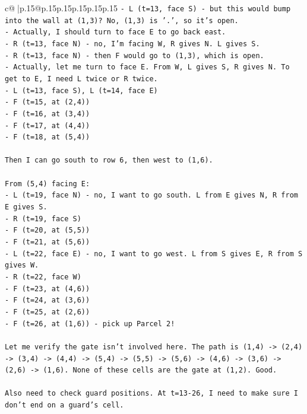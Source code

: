 \documentclass{article}
\begin{document}
{\begin{supertabular}{c@{$\;$}|p{.15\linewidth}@{}p{.15\linewidth}p{.15\linewidth}p{.15\linewidth}p{.15\linewidth}p{.15\linewidth}}
{{{\texttt{{-} L (t=13, face S) {-} but this would bump into the wall at (1,3)? No, (1,3) is '.', so it's open.} \\
\texttt{{-} Actually, I should turn to face E to go back east.} \\
\texttt{{-} R (t=13, face N) {-} no, I'm facing W, R gives N. L gives S.} \\
\texttt{{-} R (t=13, face N) {-} then F would go to (1,3), which is open.} \\
\texttt{{-} Actually, let me turn to face E. From W, L gives S, R gives N. To get to E, I need L twice or R twice.} \\
\texttt{{-} L (t=13, face S), L (t=14, face E)} \\
\texttt{{-} F (t=15, at (2,4))} \\
\texttt{{-} F (t=16, at (3,4))} \\
\texttt{{-} F (t=17, at (4,4))} \\
\texttt{{-} F (t=18, at (5,4))} \\
\\ 
\texttt{Then I can go south to row 6, then west to (1,6).} \\
\\ 
\texttt{From (5,4) facing E:} \\
\texttt{{-} L (t=19, face N) {-} no, I want to go south. L from E gives N, R from E gives S.} \\
\texttt{{-} R (t=19, face S)} \\
\texttt{{-} F (t=20, at (5,5))} \\
\texttt{{-} F (t=21, at (5,6))} \\
\texttt{{-} L (t=22, face E) {-} no, I want to go west. L from S gives E, R from S gives W.} \\
\texttt{{-} R (t=22, face W)} \\
\texttt{{-} F (t=23, at (4,6))} \\
\texttt{{-} F (t=24, at (3,6))} \\
\texttt{{-} F (t=25, at (2,6))} \\
\texttt{{-} F (t=26, at (1,6)) {-} pick up Parcel 2!} \\
\\ 
\texttt{Let me verify the gate isn't involved here. The path is (1,4) {-}> (2,4) {-}> (3,4) {-}> (4,4) {-}> (5,4) {-}> (5,5) {-}> (5,6) {-}> (4,6) {-}> (3,6) {-}> (2,6) {-}> (1,6). None of these cells are the gate at (1,2). Good.} \\
\\ 
\texttt{Also need to check guard positions. At t=13{-}26, I need to make sure I don't end on a guard's cell.} \\
}}}
\end{supertabular}}
\end{document}
